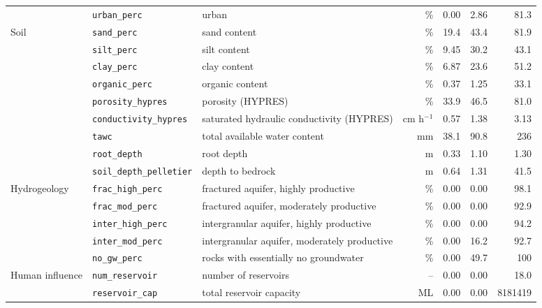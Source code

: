\begin{table}[htbp]
{\begin{tabular}{lllrrrr}
 & \texttt{urban\_perc} & urban & \% & 0.00 & 2.86 & 81.3 \\
Soil & \texttt{sand\_perc} & sand content & \% & 19.4 & 43.4 & 81.9 \\
 & \texttt{silt\_perc} & silt content & \% & 9.45 & 30.2 & 43.1 \\
 & \texttt{clay\_perc} & clay content & \% & 6.87 & 23.6 & 51.2 \\
 & \texttt{organic\_perc} & organic content & \% & 0.37 & 1.25 & 33.1 \\
 & \texttt{porosity\_hypres} & porosity (HYPRES) & \% & 33.9 & 46.5 & 81.0 \\
 & \texttt{conductivity\_hypres} & saturated hydraulic conductivity (HYPRES) & cm h$^{-1}$ & 0.57 & 1.38 & 3.13 \\
 & \texttt{tawc} & total available water content & mm & 38.1 & 90.8 & 236 \\
 & \texttt{root\_depth} & root depth & m & 0.33 & 1.10 & 1.30 \\
 & \texttt{soil\_depth\_pelletier} & depth to bedrock & m & 0.64 & 1.31 & 41.5 \\
Hydrogeology & \texttt{frac\_high\_perc} & fractured aquifer, highly productive & \% & 0.00 & 0.00 & 98.1 \\
 & \texttt{frac\_mod\_perc} & fractured aquifer, moderately productive & \% & 0.00 & 0.00 & 92.9 \\
 & \texttt{inter\_high\_perc} & intergranular aquifer, highly productive & \% & 0.00 & 0.00 & 94.2 \\
 & \texttt{inter\_mod\_perc} & intergranular aquifer, moderately productive & \% & 0.00 & 16.2 & 92.7 \\
 & \texttt{no\_gw\_perc} & rocks with essentially no groundwater & \% & 0.00 & 49.7 & 100 \\
Human influence & \texttt{num\_reservoir} & number of reservoirs & -- & 0.00 & 0.00 & 18.0 \\
 & \texttt{reservoir\_cap} & total reservoir capacity & ML & 0.00 & 0.00 & 8181419 \\
\bottomrule
\end{tabular}}
\end{table}
